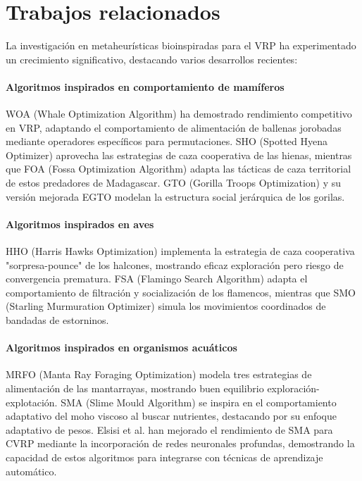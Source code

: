 \documentclass[conference,a4paper]{IEEEtran}
\begin{document}
\section{Trabajos relacionados}\vspace{-0.2cm}
La investigación en metaheurísticas bioinspiradas para el VRP ha experimentado un crecimiento significativo, destacando varios desarrollos recientes:

\paragraph{Algoritmos inspirados en comportamiento de mamíferos} WOA (Whale Optimization Algorithm) \cite{Mirjalili2016WOA} ha demostrado rendimiento competitivo en VRP, adaptando el comportamiento de alimentación de ballenas jorobadas mediante operadores específicos para permutaciones. SHO (Spotted Hyena Optimizer) \cite{Mirjalili2017SHO} aprovecha las estrategias de caza cooperativa de las hienas, mientras que FOA (Fossa Optimization Algorithm) \cite{Hamadneh2024FOA} adapta las tácticas de caza territorial de estos predadores de Madagascar. GTO (Gorilla Troops Optimization) \cite{Abdollahzadeh2021GTO} y su versión mejorada EGTO \cite{Hassan2024EGTO} modelan la estructura social jerárquica de los gorilas.

\paragraph{Algoritmos inspirados en aves} HHO (Harris Hawks Optimization) \cite{Heidari2019HHO} implementa la estrategia de caza cooperativa "sorpresa-pounce" de los halcones, mostrando eficaz exploración pero riesgo de convergencia prematura. FSA (Flamingo Search Algorithm) \cite{Wang2021FSA} adapta el comportamiento de filtración y socialización de los flamencos, mientras que SMO (Starling Murmuration Optimizer) \cite{Zamani2022SMO} simula los movimientos coordinados de bandadas de estorninos.

\paragraph{Algoritmos inspirados en organismos acuáticos} MRFO (Manta Ray Foraging Optimization) \cite{Zhao2020MRFO} modela tres estrategias de alimentación de las mantarrayas, mostrando buen equilibrio exploración-explotación. SMA (Slime Mould Algorithm) \cite{Li2020SMA} se inspira en el comportamiento adaptativo del moho viscoso al buscar nutrientes, destacando por su enfoque adaptativo de pesos. Elsisi et al. \cite{Elsisi2023DNN} han mejorado el rendimiento de SMA para CVRP mediante la incorporación de redes neuronales profundas, demostrando la capacidad de estos algoritmos para integrarse con técnicas de aprendizaje automático.
\end{document}
